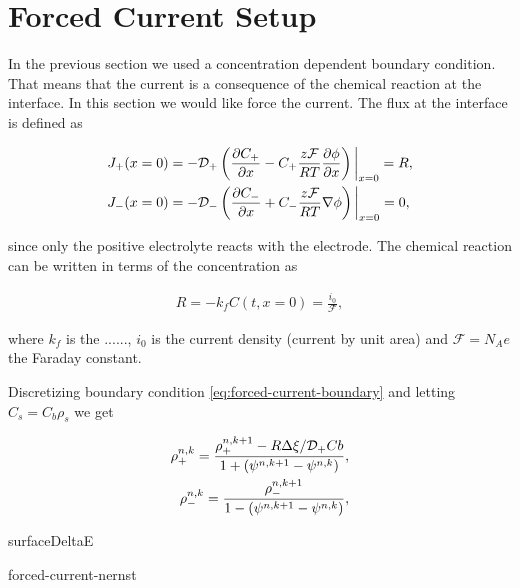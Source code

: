 \section{Forced Current Setup}

In the previous section we used a concentration dependent boundary condition. That means that the current is a consequence of the chemical reaction at the interface. In this section we would like force the current. The flux at the interface is defined as

\begin{align}
	\label{eq:forced-current-boundary}
    J_+(x = 0) &= -\mathcal{D}_+\left({\frac{\partial C_+}{\partial x} - C_+ \frac{z\mathcal{F}}{RT}\frac{\partial\phi}{\partial x}}\right)\bigg|_{x= 0}= R,\\
    J_-(x = 0) &= -\mathcal{D}_-\left({\frac{\partial C_-}{\partial x} + C_- \frac{z\mathcal{F}}{RT}\nabla\phi}\right) \bigg|_{x= 0} = 0,\\
\end{align}

since only the positive electrolyte reacts with the electrode. The chemical reaction can be written in terms of the concentration as

\begin{align}
	R = -k_f C(t, x=0) = \frac{i_0}{\mathcal{F}},
\end{align}

where $k_f$ is the ......, $i_0$ is the current density (current by unit area) and $\mathcal{F}=N_A e$ the Faraday constant.

Discretizing boundary condition \ref{eq:forced-current-boundary} and letting $C_s = C_b\rho_s$ we get

\begin{align}
	\rho_+^{n,k}=\frac{\rho_+^{n,k+1}-R\Delta \xi/\mathcal{D_+}Cb}{1+\left({\psi^{n,k+1}-\psi^{n,k}}\right)},\\
	\rho_-^{n,k}=\frac{\rho_-^{n,k+1}}{1-\left({\psi^{n,k+1}-\psi^{n,k}}\right)},
\end{align}

surfaceDeltaE

forced-current-nernst
